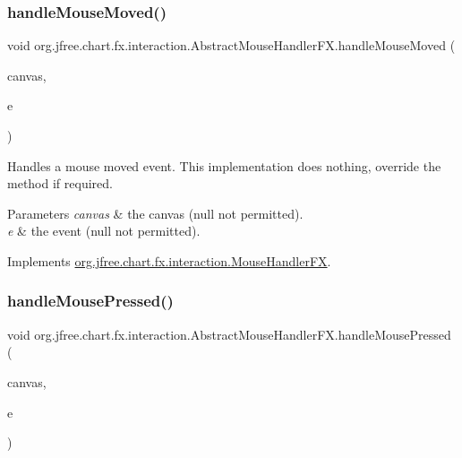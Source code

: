 \subsubsection{\texorpdfstring{handle\+Mouse\+Moved()}{handleMouseMoved()}}
{\footnotesize\ttfamily void org.\+jfree.\+chart.\+fx.\+interaction.\+Abstract\+Mouse\+Handler\+F\+X.\+handle\+Mouse\+Moved (\begin{DoxyParamCaption}\item[{\mbox{\hyperlink{classorg_1_1jfree_1_1chart_1_1fx_1_1_chart_canvas}{Chart\+Canvas}}}]{canvas,  }\item[{Mouse\+Event}]{e }\end{DoxyParamCaption})}

Handles a mouse moved event. This implementation does nothing, override the method if required.


\begin{DoxyParams}{Parameters}
{\em canvas} & the canvas ({\ttfamily null} not permitted). \\
\hline
{\em e} & the event ({\ttfamily null} not permitted). \\
\hline
\end{DoxyParams}


Implements \mbox{\hyperlink{interfaceorg_1_1jfree_1_1chart_1_1fx_1_1interaction_1_1_mouse_handler_f_x_a71fb6066ff587b62484100705777fc19}{org.\+jfree.\+chart.\+fx.\+interaction.\+Mouse\+Handler\+FX}}.

\mbox{\label{classorg_1_1jfree_1_1chart_1_1fx_1_1interaction_1_1_abstract_mouse_handler_f_x_a3e8a17fbf7481ed55e99759ab96746ef}} 
\subsubsection{\texorpdfstring{handle\+Mouse\+Pressed()}{handleMousePressed()}}
{\footnotesize\ttfamily void org.\+jfree.\+chart.\+fx.\+interaction.\+Abstract\+Mouse\+Handler\+F\+X.\+handle\+Mouse\+Pressed (\begin{DoxyParamCaption}\item[{\mbox{\hyperlink{classorg_1_1jfree_1_1chart_1_1fx_1_1_chart_canvas}{Chart\+Canvas}}}]{canvas,  }\item[{Mouse\+Event}]{e }\end{DoxyParamCaption})}


